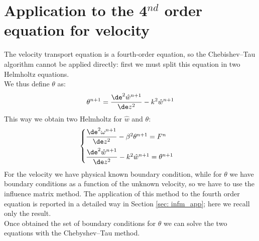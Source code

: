 \section{Application to the 4$^{nd}$ order equation for velocity}
The velocity transport equation is a fourth-order equation, so the Chebishev--Tau algorithm cannot be applied directly: first we must split this equation in two Helmholtz equations.\\
We thus define $\theta$ as:
\[
\theta^{n+1}=\frac{\de^2\hat w^{n+1}}{\de z^2}-k^2\hat w^{n+1}
\]
This way we obtain two Helmholtz for $\hat w$ and $\theta$:
\[
\begin{cases}
\dfrac{\de^2\omega^{n+1}}{\de z^2}-\beta^2\theta^{n+1}=F^{n}\\[2ex]
\dfrac{\de^2\hat w^{n+1}}{\de z^2}-k^2\hat w^{n+1}=\theta^{n+1}
\end{cases}
\]
For the velocity we have physical known boundary condition, while for $\theta$ we have boundary conditions as a function of the unknown velocity, so we have to use the influence matrix method. The application of this method to the fourth order equation is reported in a detailed way in Section \ref{sec: infm_app}; here we recall only the result.\\
Once obtained the set of boundary conditions for $\theta$ we can solve the two equations with the Chebyshev--Tau method.













